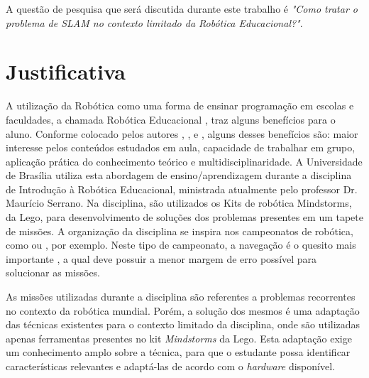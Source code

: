 	A questão de pesquisa que será discutida durante este trabalho é \textit{"Como tratar o problema de SLAM no contexto limitado da Robótica Educacional?"}.

\section{Justificativa}

	A utilização da Robótica como uma forma de ensinar programação em escolas e faculdades, a chamada Robótica Educacional \cite{roboticaEducacionalAulasMatematica}, traz alguns benefícios para o aluno. Conforme colocado pelos autores \cite{teachingWithRoboticKit}, \cite{roboticEducationBasedLego}, \cite{roboticaEducacionalAulasMatematica} e \cite{evaluationRoboticEducationScale}, alguns desses benefícios são: maior interesse pelos conteúdos estudados em aula, capacidade de trabalhar em grupo, aplicação prática do conhecimento teórico e multidisciplinaridade. A Universidade de Brasília utiliza esta abordagem de ensino/aprendizagem durante a disciplina de Introdução à Robótica Educacional, ministrada atualmente pelo professor Dr. Maurício Serrano. Na disciplina, são utilizados os Kits de robótica Mindstorms, da Lego, para desenvolvimento de soluções dos problemas presentes em um tapete de missões. A organização da disciplina se inspira nos campeonatos de robótica, como \cite{ciber-rato} ou \cite{roboBulldozerIV}, por exemplo. Neste tipo de campeonato, a navegação é o quesito mais importante \cite{ciber-rato}, a qual deve possuir a menor margem de erro possível para solucionar as missões.

	As missões utilizadas durante a disciplina são referentes a problemas recorrentes no contexto da robótica mundial. Porém, a solução dos mesmos é uma adaptação das técnicas existentes para o contexto limitado da disciplina, onde são utilizadas apenas ferramentas presentes no kit \textit{Mindstorms} da Lego. Esta adaptação exige um conhecimento amplo sobre a técnica, para que o estudante possa identificar características relevantes e adaptá-las de acordo com o \textit{hardware} disponível.


